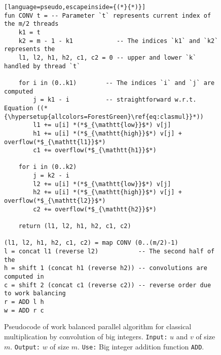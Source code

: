 \begin{figure}
\begin{lstlisting}[language=pseudo,escapeinside={(*}{*)}]
fun CONV t = -- Parameter `t` represents current index of the m/2 threads
    k1 = t
    k2 = m - 1 - k1            -- The indices `k1` and `k2` represents the
    l1, l2, h1, h2, c1, c2 = 0 -- upper and lower `k` handled by thread `t`

    for i in (0..k1)        -- The indices `i` and `j` are computed
        j = k1 - i          -- straightforward w.r.t. Equation ((*{\hypersetup{allcolors=ForestGreen}\ref{eq:clasmul}}*))
        l1 += u[i] *(*$_{\mathtt{low}}$*) v[j]
        h1 += u[i] *(*$_{\mathtt{high}}$*) v[j] + overflow(*$_{\mathtt{l1}}$*)
        c1 += overflow(*$_{\mathtt{h1}}$*)

    for i in (0..k2)
        j = k2 - i
        l2 += u[i] *(*$_{\mathtt{low}}$*) v[j]
        h2 += u[i] *(*$_{\mathtt{high}}$*) v[j] + overflow(*$_{\mathtt{l2}}$*)
        c2 += overflow(*$_{\mathtt{h2}}$*)

    return (l1, l2, h1, h2, c1, c2)

(l1, l2, h1, h2, c1, c2) = map CONV (0..(m/2)-1)
l = concat l1 (reverse l2)           -- The second half of the
h = shift 1 (concat h1 (reverse h2)) -- convolutions are computed in
c = shift 2 (concat c1 (reverse c2)) -- reverse order due to work balancing
r = ADD l h
w = ADD r c
\end{lstlisting}
  \caption{\footnotesize Pseudocode of work balanced parallel algorithm for classical multiplication by convolution of big integers. \texttt{Input:} $u$ and $v$ of size $m$. \texttt{Output:} $w$ of size $m$. \texttt{Use:} Big integer addition function \texttt{ADD}.}
  \label{fig:mulparalg}
\end{figure}

